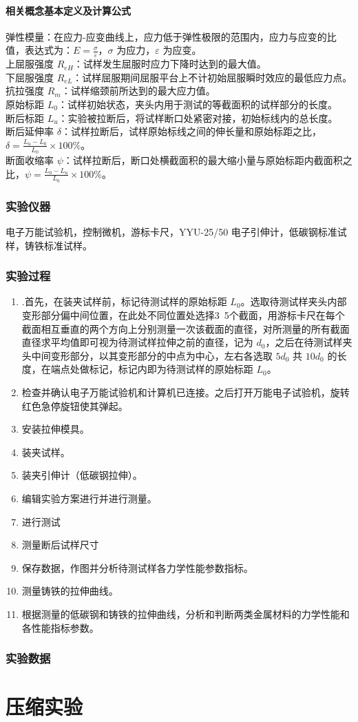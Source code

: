 \documentclass[a4paper,utf8]{article}
\begin{document}
\subsection{相关概念基本定义及计算公式}
\noindent 弹性模量：在应力-应变曲线上，应力低于弹性极限的范围内，应力与应变的比值，表达式为：\linebreak $E =\displaystyle \frac{\sigma}{\varepsilon}$，$\sigma$ 为应力，$\varepsilon$ 为应变。\\
上屈服强度 $R_{eH}$：试样发生屈服时应力下降时达到的最大值。\\
下屈服强度 $R_{eL}$：试样屈服期间屈服平台上不计初始屈服瞬时效应的最低应力点。\\
抗拉强度 $R_m$：试样缩颈前所达到的最大应力值。\\
原始标距 $L_0$：试样初始状态，夹头内用于测试的等截面积的试样部分的长度。\\
断后标距 $L_u$：实验被拉断后，将试样断口处紧密对接，初始标线内的总长度。\\
断后延伸率 $\delta$：试样拉断后，试样原始标线之间的伸长量和原始标距之比，$\delta = \displaystyle\frac{L_u-L_0}{L_0}\times 100\%$。\\
断面收缩率 $\psi$：试样拉断后，断口处横截面积的最大缩小量与原始标距内截面积之比，\linebreak $\psi = \displaystyle\frac{L_0-L_u}{L_0}\times 100\%$。
\section{实验仪器}%
电子万能试验机，控制微机，游标卡尺，YYU-25/50 电子引伸计，低碳钢标准试样，铸铁标准试样。
\section{实验过程}%
\begin{enumerate}
    \item .首先，在装夹试样前，标记待测试样的原始标距 $L_0$。选取待测试样夹头内部变形部分偏中间位置，在此处不同位置处选择3~5个截面，用游标卡尺在每个截面相互垂直的两个方向上分别测量一次该截面的直径，对所测量的所有截面直径求平均值即可视为待测试样拉伸之前的直径，记为 $d_0$，之后在待测试样夹头中间变形部分，以其变形部分的中点为中心，左右各选取 $5d_0$ 共 $10d_0$ 的长度，在端点处做标记，标记内即为待测试样的原始标距 $L_0$。
    \item 检查并确认电子万能试验机和计算机已连接。之后打开万能电子试验机，旋转红色急停旋钮使其弹起。
    \item 安装拉伸模具。
    \item 装夹试样。
    \item 装夹引伸计（低碳钢拉伸）。
    \item 编辑实验方案进行并进行测量。
    \item 进行测试
    \item 测量断后试样尺寸
    \item 保存数据，作图并分析待测试样各力学性能参数指标。
    \item 测量铸铁的拉伸曲线。
    \item 根据测量的低碳钢和铸铁的拉伸曲线，分析和判断两类金属材料的力学性能和各性能指标参数。
\end{enumerate}
\section{实验数据}
\part{压缩实验}
\end{document}
